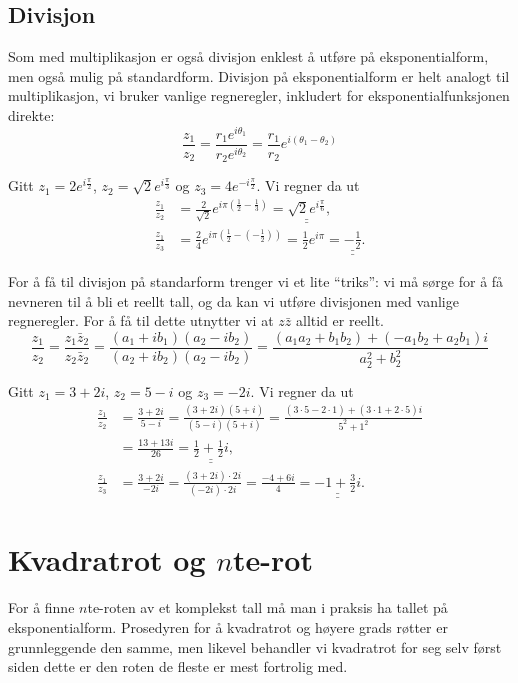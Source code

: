 \documentclass[a4paper,norsk,12pt]{article}
\newcommand{\ans}[1]{\underline{\underline{#1}}}
\newcounter{exa}
\begin{document}
\subsection{Divisjon}
Som med multiplikasjon er også divisjon enklest å utføre på eksponentialform, men også mulig på standardform. Divisjon på eksponentialform er helt analogt til multiplikasjon, vi bruker vanlige regneregler, inkludert for eksponentialfunksjonen direkte:
\begin{displaymath}
	\frac{z_1}{z_2} = \frac{r_1e^{i\theta_1}}{r_2e^{i\theta_2}} = \frac{r_1}{r_2}e^{i(\theta_1-\theta_2)}
\end{displaymath}
\begin{texample}
Gitt $z_1 = 2e^{ i\frac{\pi}{2}}$, $z_2 = \sqrt{2}e^{i\frac{\pi}{3}}$ og $z_3 = 4e^{-i\frac{\pi}{2}}$. Vi regner da ut
\begin{align*}
	\frac{z_1}{z_2} &= \frac{2}{\sqrt{2}}e^{i\pi\left(\frac12-\frac13\right)} = \ans{\sqrt{2}e^{i\frac{\pi}{6}}}, \\
	\frac{z_1}{z_3} &= \frac{2}{4}e^{i\pi\left(\frac12-\left(-\frac12\right)\right)} = \frac12e^{i\pi} = \ans{-\frac12}.
\end{align*}
\end{texample}
For å få til divisjon på standarform trenger vi et lite ``triks'': vi må sørge for å få nevneren til å bli et reellt tall, og da kan vi utføre divisjonen med vanlige regneregler. For å få til dette utnytter vi at $z\bar{z}$ alltid er reellt.
\begin{displaymath}
	\frac{z_1}{z_2} = \frac{z_1\bar{z}_2}{z_2\bar{z}_2} = \frac{(a_1+ib_1)(a_2-ib_2)}{(a_2+ib_2)(a_2-ib_2)} = \frac{(a_1a_2+b_1b_2)+(-a_1b_2+a_2b_1)i}{a_2^2+b_2^2}
\end{displaymath}
\begin{texample}
Gitt $z_1 = 3+2i$, $z_2 = 5-i$ og $z_3 = -2i$. Vi regner da ut
\begin{align*}
	\frac{z_1}{z_2} &= \frac{3+2i}{5-i} = \frac{(3+2i)(5+i)}{(5-i)(5+i)} = \frac{(3\cdot5-2\cdot1) + (3\cdot1+2\cdot5)i}{5^2+1^2} \\
	&= \frac{13 + 13i}{26} = \ans{\frac12 + \frac12 i}, \\[12pt]
	\frac{z_1}{z_3} &= \frac{3+2i}{-2i} = \frac{(3+2i)\cdot2i}{(-2i)\cdot 2i} = \frac{-4+6i}{4} = \ans{-1+\frac{3}{2}i}.
\end{align*}
\end{texample}

\section{Kvadratrot og $n$te-rot}
For å finne $n$te-roten av et komplekst tall må man i praksis ha tallet på eksponentialform. Prosedyren for å kvadratrot og høyere grads røtter er grunnleggende den samme, men likevel behandler vi kvadratrot for seg selv først siden dette er den roten de fleste er mest fortrolig med. 
\end{document}
